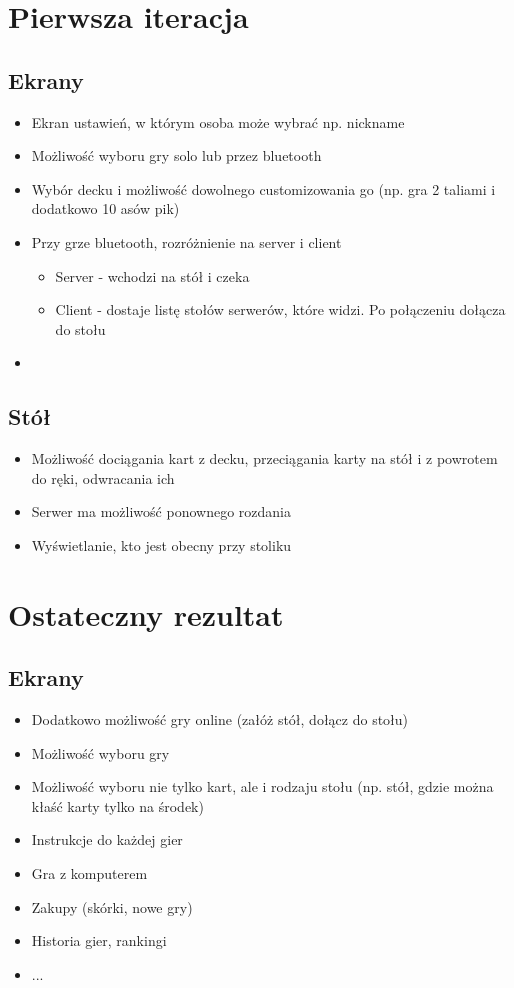 \documentclass{article}
\begin{document}
\section{Pierwsza iteracja}
\subsection{Ekrany}
\begin{itemize}
	\item Ekran ustawień, w którym osoba może wybrać np. nickname
	\item Możliwość wyboru gry solo lub przez bluetooth
	\item Wybór decku i możliwość dowolnego customizowania go (np. gra 2 taliami i dodatkowo 10 asów pik)
	\item Przy grze bluetooth, rozróżnienie na server i client
		\begin{itemize}
			\item Server - wchodzi na stół i czeka
			\item Client - dostaje listę stołów serwerów, które widzi. Po połączeniu dołącza do stołu
		\end{itemize}
	\item 
		
\end{itemize}

\subsection{Stół}
\begin{itemize}
	\item Możliwość dociągania kart z decku, przeciągania karty na stół i z powrotem do ręki,
		odwracania ich
	\item Serwer ma możliwość ponownego rozdania
	\item Wyświetlanie, kto jest obecny przy stoliku
\end{itemize}


\section{Ostateczny rezultat}
\subsection{Ekrany}
\begin{itemize}
	\item Dodatkowo możliwość gry online (załóż stół, dołącz do stołu)
	\item Możliwość wyboru gry
	\item Możliwość wyboru nie tylko kart, ale i rodzaju stołu (np. stół, gdzie można kłaść karty tylko na środek)
	\item Instrukcje do każdej gier
	\item Gra z komputerem
	\item Zakupy (skórki, nowe gry)
	\item Historia gier, rankingi
	\item ...
		
\end{itemize}
\end{document}
